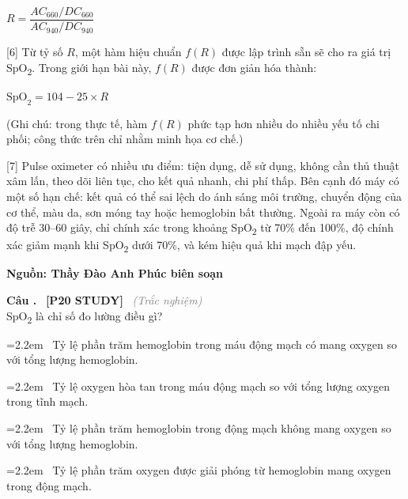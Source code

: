 \documentclass[12pt,a4paper,twoside]{article}
\newcounter{qcounter}
\newcommand{\question}[2][]{%
    \stepcounter{qcounter}%
    \par\vspace{5pt}%
    \noindent\textcolor{primaryBlue}{\textbf{Câu \theqcounter.}}~%
    \textcolor{secondaryBlue}{\small\textbf{[P20 STUDY]}}~%
    \if\relax\detokenize{#1}\relax\else\textcolor{gray}{\small\textit{(#1)}}~\fi\\[1pt]
    \noindent #2%
}
\newcommand{\choiceitem}[2]{%
    \tikz[baseline=-0.5ex]{
        \node[draw=primaryBlue, circle, minimum size=1.5em, inner sep=0pt, thick] {\textbf{#1}};
    }~#2%
}
\newenvironment{readingpassage}[1][]{%
    \begin{tcolorbox}[enhanced, colback=grayLight, colframe=secondaryBlue,
        coltitle=textDark, fonttitle=\bfseries, title={#1},
        rounded corners, arc=3mm, boxrule=1pt,
        left=15pt, right=15pt, top=10pt, bottom=10pt,
        breakable, before skip=10pt, after skip=10pt, drop fuzzy shadow]
    \setstretch{1.3}
}{\end{tcolorbox}}
\begin{document}
\begin{readingpassage}[]
\vspace{2pt}
\begin{center}
$R = \dfrac{AC_{660} / DC_{660}}{AC_{940} / DC_{940}}$
\end{center}
\vspace{2pt}

[6] Từ tỷ số $R$, một hàm hiệu chuẩn $f(R)$ được lập trình sẵn sẽ cho ra giá trị SpO\textsubscript{2}. Trong giới hạn bài này, $f(R)$ được đơn giản hóa thành:

\vspace{2pt}
\begin{center}
$\text{SpO}_2 = 104 - 25 \times R$
\end{center}
\vspace{2pt}

(Ghi chú: trong thực tế, hàm $f(R)$ phức tạp hơn nhiều do nhiều yếu tố chi phối; công thức trên chỉ nhằm minh họa cơ chế.)

[7] Pulse oximeter có nhiều ưu điểm: tiện dụng, dễ sử dụng, không cần thủ thuật xâm lấn, theo dõi liên tục, cho kết quả nhanh, chi phí thấp. Bên cạnh đó máy có một số hạn chế: kết quả có thể sai lệch do ánh sáng môi trường, chuyển động của cơ thể, màu da, sơn móng tay hoặc hemoglobin bất thường. Ngoài ra máy còn có độ trễ 30--60 giây, chỉ chính xác trong khoảng SpO\textsubscript{2} từ 70\% đến 100\%, độ chính xác giảm mạnh khi SpO\textsubscript{2} dưới 70\%, và kém hiệu quả khi mạch đập yếu.

\vspace{6pt}

\hfill\textbf{Nguồn: Thầy Đào Anh Phúc biên soạn}

\end{readingpassage}
\vspace{2pt}

\question[Trắc nghiệm]{SpO\textsubscript{2} là chỉ số đo lường điều gì?}
\par\vspace{4pt}
\noindent\hangindent=2.2em\choiceitem{A}{Tỷ lệ phần trăm hemoglobin trong máu động mạch có mang oxygen so với tổng lượng hemoglobin.}\par\vspace{4pt}
\noindent\hangindent=2.2em\choiceitem{B}{Tỷ lệ oxygen hòa tan trong máu động mạch so với tổng lượng oxygen trong tĩnh mạch.}\par\vspace{4pt}
\noindent\hangindent=2.2em\choiceitem{C}{Tỷ lệ phần trăm hemoglobin trong động mạch không mang oxygen so với tổng lượng hemoglobin.}\par\vspace{4pt}
\noindent\hangindent=2.2em\choiceitem{D}{Tỷ lệ phần trăm oxygen được giải phóng từ hemoglobin mang oxygen trong động mạch.}\par\vspace{4pt}
\end{document}
